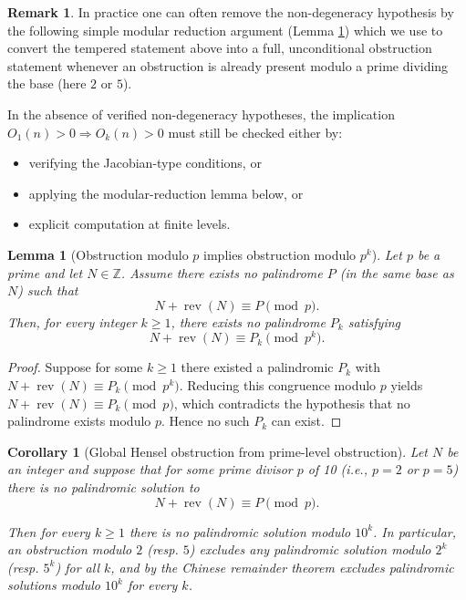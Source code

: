 \documentclass[11pt,a4paper]{article}
\theoremstyle{plain}
\newtheorem{lemma}[theorem]{Lemma}
\newtheorem{corollary}[theorem]{Corollary}
\theoremstyle{definition}
\newtheorem{remark}[theorem]{Remark}
\begin{document}
\begin{remark}
In practice one can often remove the non-degeneracy hypothesis by the following simple modular reduction argument (Lemma \ref{lem:mod_p_lift}) which we use to convert the tempered statement above into a full, unconditional obstruction statement whenever an obstruction is already present modulo a prime dividing the base (here $2$ or $5$).

In the absence of verified non-degeneracy hypotheses, the implication $O_1(n)>0 \Rightarrow O_k(n)>0$ must still be checked either by:
\begin{itemize}
\item verifying the Jacobian-type conditions, or
\item applying the modular-reduction lemma below, or
\item explicit computation at finite levels.
\end{itemize}
\end{remark}

\begin{lemma}[Obstruction modulo $p$ implies obstruction modulo $p^k$]\label{lem:mod_p_lift}
Let $p$ be a prime and let $N\in\mathbb{Z}$.  
Assume there exists no palindrome $P$ (in the same base as $N$) such that
\[
N + \operatorname{rev}(N) \equiv P \pmod p.
\]
Then, for every integer $k \ge 1$, there exists no palindrome $P_k$ satisfying
\[
N + \operatorname{rev}(N) \equiv P_k \pmod{p^k}.
\]
\end{lemma}

\begin{proof}
Suppose for some $k\ge1$ there existed a palindromic $P_k$ with
$N+\operatorname{rev}(N)\equiv P_k\pmod{p^k}$. Reducing this congruence modulo $p$ yields
$N+\operatorname{rev}(N)\equiv P_k\pmod p$, which contradicts the hypothesis that no palindrome exists modulo $p$. Hence no such $P_k$ can exist.
\end{proof}

\begin{corollary}[Global Hensel obstruction from prime-level obstruction]\label{cor:global_hensel}
Let $N$ be an integer and suppose that for some prime divisor $p$ of 10 (i.e., $p=2$ or $p=5$) there is no palindromic solution to
\[N+\operatorname{rev}(N)\equiv P\pmod p.\]

Then for every $k\ge1$ there is no palindromic solution modulo $10^k$. In particular, an obstruction modulo $2$ (resp. $5$) excludes any palindromic solution modulo $2^k$ (resp. $5^k$) for all $k$, and by the Chinese remainder theorem excludes palindromic solutions modulo $10^k$ for every $k$.
\end{corollary}
\end{document}
